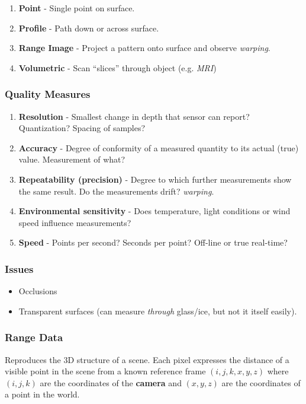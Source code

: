 \documentclass[english, 10pt]{article}
\begin{document}
\begin{enumerate}
\item \textbf{Point} - Single point on surface.
\item \textbf{Profile} - Path down or across surface.
\item \textbf{Range Image} - Project a pattern onto surface and observe \textit{warping}.
\item \textbf{Volumetric} - Scan ``slices'' through object (e.g. \textit{MRI})
\end{enumerate}

\subsubsection{Quality Measures}

\begin{enumerate}
\item \textbf{Resolution} - Smallest change in depth that sensor can report? Quantization? Spacing of samples?
\item \textbf{Accuracy} - Degree of conformity of a measured quantity to its actual (true) value. Measurement of what?
\item \textbf{Repeatability (precision)} - Degree to which further measurements show the same result. Do the measurements drift? \textit{warping}.
\item \textbf{Environmental sensitivity} - Does temperature, light conditions or wind speed influence measurements?
\item \textbf{Speed} - Points per second? Seconds per point? Off-line or true real-time?
\end{enumerate}

\subsubsection{Issues}

\begin{itemize}
\item Occlusions
\item Transparent surfaces (can measure \textit{through} glass/ice, but not it itself easily).
\end{itemize}

\subsubsection{Range Data}

Reproduces the 3D structure of a scene. Each pixel expresses the distance of a visible point in the scene from a known reference frame $(i, j, k, x, y, z)$ where $(i, j, k)$ are the coordinates of the \textbf{camera} and $(x, y, z)$ are the coordinates of a point in the world. \\
\end{document}
